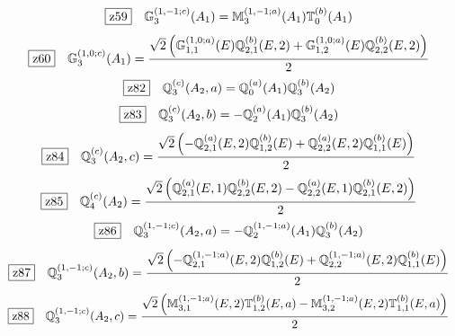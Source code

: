 \documentclass[fleqn,10pt,landscape]{jsarticle}
\begin{document}
\begin{dmath*}
\hspace*{3mm}\fbox{z59}\quad \mathbb{G}_{3}^{(1,-1;c)}(A_{1})=\mathbb{M}_{3}^{(1,-1;a)}(A_{1}) \mathbb{T}_{0}^{(b)}(A_{1})
\end{dmath*}
\begin{dmath*}
\hspace*{3mm}\fbox{z60}\quad \mathbb{G}_{3}^{(1,0;c)}(A_{1})=\frac{\sqrt{2} \left(\mathbb{G}_{1,1}^{(1,0;a)}(E) \mathbb{Q}_{2,1}^{(b)}(E,2) + \mathbb{G}_{1,2}^{(1,0;a)}(E) \mathbb{Q}_{2,2}^{(b)}(E,2)\right)}{2}
\end{dmath*}
\begin{dmath*}
\hspace*{3mm}\fbox{z82}\quad \mathbb{Q}_{3}^{(c)}(A_{2},a)=\mathbb{Q}_{0}^{(a)}(A_{1}) \mathbb{Q}_{3}^{(b)}(A_{2})
\end{dmath*}
\begin{dmath*}
\hspace*{3mm}\fbox{z83}\quad \mathbb{Q}_{3}^{(c)}(A_{2},b)=- \mathbb{Q}_{2}^{(a)}(A_{1}) \mathbb{Q}_{3}^{(b)}(A_{2})
\end{dmath*}
\begin{dmath*}
\hspace*{3mm}\fbox{z84}\quad \mathbb{Q}_{3}^{(c)}(A_{2},c)=\frac{\sqrt{2} \left(- \mathbb{Q}_{2,1}^{(a)}(E,2) \mathbb{Q}_{1,2}^{(b)}(E) + \mathbb{Q}_{2,2}^{(a)}(E,2) \mathbb{Q}_{1,1}^{(b)}(E)\right)}{2}
\end{dmath*}
\begin{dmath*}
\hspace*{3mm}\fbox{z85}\quad \mathbb{Q}_{4}^{(c)}(A_{2})=\frac{\sqrt{2} \left(\mathbb{Q}_{2,1}^{(a)}(E,1) \mathbb{Q}_{2,2}^{(b)}(E,2) - \mathbb{Q}_{2,2}^{(a)}(E,1) \mathbb{Q}_{2,1}^{(b)}(E,2)\right)}{2}
\end{dmath*}
\begin{dmath*}
\hspace*{3mm}\fbox{z86}\quad \mathbb{Q}_{3}^{(1,-1;c)}(A_{2},a)=- \mathbb{Q}_{2}^{(1,-1;a)}(A_{1}) \mathbb{Q}_{3}^{(b)}(A_{2})
\end{dmath*}
\begin{dmath*}
\hspace*{3mm}\fbox{z87}\quad \mathbb{Q}_{3}^{(1,-1;c)}(A_{2},b)=\frac{\sqrt{2} \left(- \mathbb{Q}_{2,1}^{(1,-1;a)}(E,2) \mathbb{Q}_{1,2}^{(b)}(E) + \mathbb{Q}_{2,2}^{(1,-1;a)}(E,2) \mathbb{Q}_{1,1}^{(b)}(E)\right)}{2}
\end{dmath*}
\begin{dmath*}
\hspace*{3mm}\fbox{z88}\quad \mathbb{Q}_{3}^{(1,-1;c)}(A_{2},c)=\frac{\sqrt{2} \left(\mathbb{M}_{3,1}^{(1,-1;a)}(E,2) \mathbb{T}_{1,2}^{(b)}(E,a) - \mathbb{M}_{3,2}^{(1,-1;a)}(E,2) \mathbb{T}_{1,1}^{(b)}(E,a)\right)}{2}
\end{dmath*}
\end{document}
